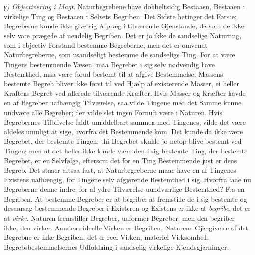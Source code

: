 \documentclass[12pt,a4paper]{book}
\newcommand{\subrunin}[1]{\emph{#1}\hspace{0.4em}}
\begin{document}
\subrunin{γ) Objectivering i Magt.} Naturbegrebene have dobbeltsidig
Bestaaen, Bestaaen i virkelige Ting og Bestaaen i Selvets Begriben. Det
Sidste betinger det Første; Begreberne kunde ikke give sig Afpræg i
tilværende Gjenstande, dersom de ikke selv vare prægede af uendelig
Begriben. Det er jo ikke de sandselige Naturting, som i objectiv
Forstand bestemme Begreberne, men det er omvendt Naturbegreberne, som
usandseligt bestemme de sandselige Ting. For at være Tingens
bestemmende Væsen, maa Begrebet i sig selv nødvendig have Bestemthed,
maa være forud bestemt til at afgive Bestemmelse. Massens bestemte
Begreb bliver ikke først til ved Hjælp af existerende Masser, ei heller
Kraftens Begreb ved allerede tilværende Kræfter. Hvis Masser og Kræfter
havde en af Begreber uafhængig Tilværelse, saa vilde Tingene med det
Samme kunne undvære alle Begreber; der vilde slet ingen Fornuft være i
Naturen. Hvis Begrebernes Tilblivelse faldt umiddelbart sammen med
Tingenes, vilde det være aldeles umuligt at sige, hvorfra det
Bestemmende kom. Det kunde da ikke være Begrebet, der bestemte Tingen,
thi Begrebet skulde jo netop blive bestemt ved Tingen; men at det heller
ikke kunde være den i sig bestemte Ting, der bestemte Begrebet, er en
Selvfølge, eftersom det for en Ting Bestemmende just er dens Begreb.
Det staaer altsaa fast, at Naturbegreberne maae have en af Tingenes
Existens uafhængig, for Tingene selv afgjørende Bestemthed i sig.
Hvorfra faae nu Begreberne denne indre, for al ydre Tilværelse
uundværlige Bestemthed? Fra en Begriben. At bestemme Begreber er at
begribe; at fremstille de i sig bestemte og desaarsag bestemmende
Begreber i Existeren og Existens er ikke at \emph{begribe}, det er at
\emph{virke}. Naturen fremstiller Begreber, udformer Begreber, men den
begriber ikke, den virker. Aandens ideelle Virken
er Begriben, Naturens Gjengivelse af det Begrebne er ikke Begriben, det
er reel Virken, materiel Virksomhed, Begrebsbestemmelsernes Udfoldning i
sandselig-virkelige Kjendsgjerninger.
\end{document}
